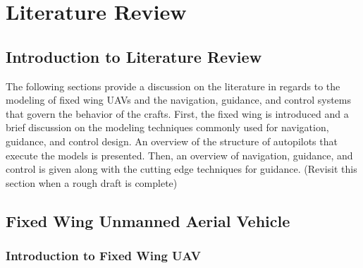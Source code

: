 \documentclass[numbered,pdftex]{ohio-etd}
\begin{document}
\chapter{Literature Review}
\section{Introduction to Literature Review}

% 
%

The following sections provide a discussion on the literature in regards to the modeling of fixed wing UAVs and the navigation, guidance, and control systems that govern the behavior of the crafts. First, the fixed wing is introduced and a brief discussion on the modeling techniques commonly used for navigation, guidance, and control design. An overview of the structure of autopilots that execute the models is presented. Then, an overview of navigation, guidance, and control is given along with the cutting edge techniques for guidance. (Revisit this section when a rough draft is complete)


\section{Fixed Wing Unmanned Aerial Vehicle}
\subsection{Introduction to Fixed Wing UAV}
\end{document}
